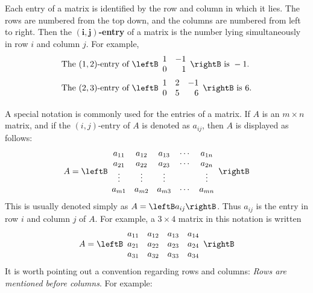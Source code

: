 Each entry of a matrix is identified by the row and column in which it lies. The rows are numbered from the top down, and the columns are numbered from left to right. Then the $\bm{(i, j)}$\textbf{-entry} of a matrix is the number lying simultaneously in row $i$ and column $j$. For example,
\begin{align*}
\mbox{The } (1, 2) \mbox{-entry of } &\leftB \begin{array}{rr}
1 & -1 \\
0 & 1
\end{array}\rightB \mbox{ is } -1. \\
\mbox{The } (2, 3) \mbox{-entry of } &\leftB \begin{array}{rrr}
1 & 2 & -1 \\
0 & 5 & 6  
\end{array}\rightB \mbox{ is } 6.
\end{align*}

A special notation is commonly used for the entries of a matrix. If $A$ is an $m \times n$ matrix, and if the $(i, j)$-entry of $A$ is denoted as $a_{ij}$, then $A$ is displayed as follows:
\begin{equation*}
A = \leftB \begin{array}{ccccc}
a_{11} & a_{12} & a_{13} & \cdots & a_{1n} \\
a_{21} & a_{22} & a_{23} & \cdots & a_{2n} \\
\vdots & \vdots & \vdots & & \vdots \\
a_{m1} & a_{m2} & a_{m3} & \cdots & a_{mn}
\end{array} \rightB
\end{equation*}
This is usually denoted simply as $A = \leftB a_{ij} \rightB$. Thus $a_{ij}$ is the entry in row $i$ and column $j$ of $A$. For example, a $3 \times 4$ matrix in this notation is written
\begin{equation*}
A = \leftB \begin{array}{cccc}
a_{11} & a_{12} & a_{13} & a_{14} \\
a_{21} & a_{22} & a_{23} & a_{24} \\
a_{31} & a_{32} & a_{33} & a_{34}
\end{array} \rightB
\end{equation*}
It is worth pointing out a convention regarding rows and columns: \textit{Rows are mentioned before columns}. For example:


